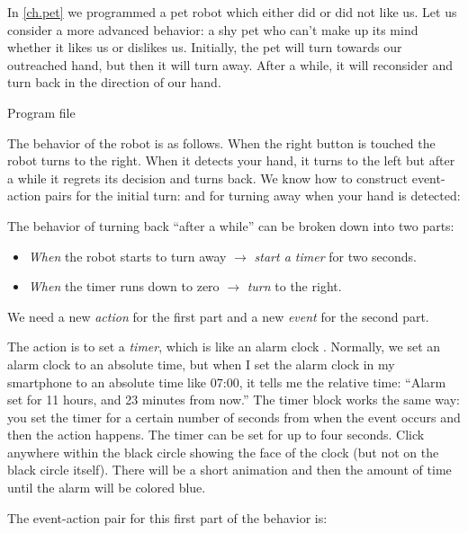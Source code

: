 
\label{ch.time}

In \cref{ch.pet} we programmed a pet robot which either did or did
not like us. Let us consider a more advanced behavior: a shy pet who
can't make up its mind whether it likes us or dislikes us. Initially,
the pet will turn towards our outreached hand, but then it will turn
away. After a while, it will reconsider and turn back in the direction
of our hand.

{\raggedleft \hfill Program file }

The behavior of the robot is as follows. When the right button is
touched the robot turns to the right. When it detects your hand, it
turns to the left but after a while it regrets its decision and turns
back. We know how to construct event-action pairs for the initial turn:
 and for turning away when your hand is detected:

The behavior of turning back ``after a while'' can be broken down into
two parts:

\begin{itemize}

\item \emph{When} the robot starts to turn away $\rightarrow$
\emph{start a timer} for two seconds.

\item \emph{When} the timer runs down to zero $\rightarrow$ \emph{turn}
to the right.

\end{itemize}

We need a new \emph{action} for the first part and a new
\emph{event} for the second part.

The action is to set a \emph{timer}, which is like an alarm clock
. Normally, we set an alarm clock to an absolute time,
but when I set the alarm clock in my smartphone to an absolute time like
07:00, it tells me the relative time: ``Alarm set for 11 hours, and 23
minutes from now.'' The timer block works the same way: you set the
timer for a certain number of seconds from when the event occurs and then the
action happens. The timer can be set for up to four seconds. Click
anywhere within the black circle showing the face of the clock (but not
on the black circle itself). There will be a short animation and then
the amount of time until the alarm will be colored blue.

\newpage
The event-action pair for this first part of the behavior is:

